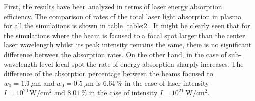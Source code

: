 First, the results have been analyzed in terms of laser energy absorption efficiency. The comparison of rates of the total laser light absorption in plasma for all the simulations is shown in table \ref{table:2}. It might be clearly seen that for the simulations where the beam is focused to a focal spot larger than the center laser wavelength whilst its peak intensity remains the same, there is no significant difference between the absorption rates. On the other hand, in the case of sub-wavelength level focal spot the rate of energy absorption sharply increases. The difference of the absorption percentage between the beams focused to $ w_0 = 1.0 \ \mu\mathrm{m} $ and $ w_0 = 0.5 \ \mu\mathrm{m} $ is $ 6.64 \ \% $ in the case of laser intensity $ I = 10^{20} \ \mathrm{W/cm^2} $ and $ 8.01 \ \% $ in the case of intensity $ I = 10^{21} \ \mathrm{W/cm^2} $.

